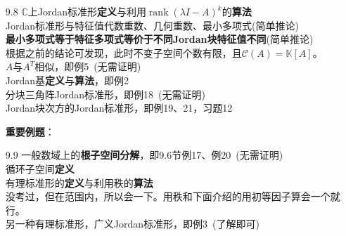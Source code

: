 \documentclass[a4paper,UTF8,fontset=windows,AutoFakeBold]{ctexart}
\DeclareMathOperator{\rank}{rank}
\newcommand*{\mc}{\mathcal{C}}
\newcommand*{\note}{\noindent *}
\begin{document}
\begin{enumerate}
    \item[9.8] $\mathbb{C}$上Jordan标准形\textbf{定义}与利用$\rank (\lambda I-A)^k$的\textbf{算法}
    \\Jordan标准形与特征值代数重数、几何重数、最小多项式(简单推论)
    \\\textbf{最小多项式等于特征多项式等价于不同Jordan块特征值不同}(简单推论)
    \\\note 根据之前的结论可发现，此时不变子空间个数有限，且$\mc(A)=\mathbb{K}[A]$。
    \\$A$与$A^T$相似，即例5\ (无需证明)
    \\Jordan基\textbf{定义}与\textbf{算法}，即例2
    \\分块三角阵Jordan标准形，即例18\ (无需证明)
    \\Jordan块次方的Jordan标准形，即例19、21，习题12

    \textbf{重要例题}：

    \item[9.9] 一般数域上的\textbf{根子空间分解}，即9.6节例17、例20\ (无需证明)
    \\循环子空间\textbf{定义}
    \\有理标准形的\textbf{定义}与利用秩的\textbf{算法}
    \\\note 没考过，但在范围内，所以会一下。用秩和下面介绍的用初等因子算会一个就行。
    \\另一种有理标准形，广义Jordan标准形，即例3\ (了解即可)
\end{enumerate}
\end{document}
